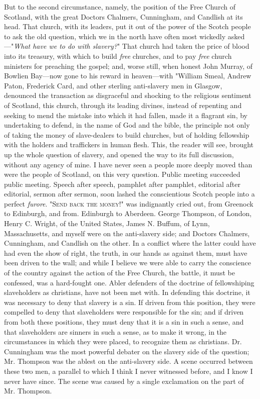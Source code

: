 But to the second circumstance, namely, the position of the Free Church
of Scotland, with the great Doctors Chalmers, Cunningham, and Candlish
at its head. That church, with its leaders, put it out of the power of
the Scotch people to ask the old question, which we in the north have
often most wickedly asked---"\emph{What have we to do with slavery?}"
That church had taken the price of blood into its treasury, with which
to build \emph{free} churches, and to pay \emph{free} church ministers
for preaching the gospel; and, worse still, when honest John Murray, of
Bowlien Bay---now gone to his reward in heaven---with "William Smeal,
Andrew Paton, Frederick Card, and other sterling anti-slavery men in
Glasgow, denounced the transaction as disgraceful and shocking to the
religious sentiment of Scotland, this church, through its leading
divines, instead of repenting and seeking to mend the mistake into which
it had fallen, made {}it a flagrant sin, by undertaking to defend, in
the name of God and the bible, the principle not only of taking the
money of slave-dealers to build churches, but of holding fellowship with
the holders and traffickers in human flesh. This, the reader will see,
brought up the whole question of slavery, and opened the way to its full
discussion, without any agency of mine. I have never seen a people more
deeply moved than were the people of Scotland, on this very question.
Public meeting succeeded public meeting. Speech after speech, pamphlet
after pamphlet, editorial after editorial, sermon after sermon, soon
lashed the conscientious Scotch people into a perfect \emph{furore}.
"\textsc{Send back the money}!" was indignantly cried out, from Greenock
to Edinburgh, and from. Edinburgh to Aberdeen. George Thompson, of
London, Henry C. Wright, of the United States, James N. Buffum, of Lynn,
Massachusetts, and myself were on the anti-slavery side; and Doctors
Chalmers, Cunningham, and Candlish on the other. In a conflict where the
latter could have had even the show of right, the truth, in our hands as
against them, must have been driven to the wall; and while I believe we
were able to carry the conscience of the country against the action of
the Free Church, the battle, it must be confessed, was a hard-fought
one. Abler defenders of the doctrine of fellowshiping slaveholders as
christians, have not been met with. In defending this doctrine, it was
necessary to deny that slavery is a sin. If driven from this position,
they were compelled to deny that slaveholders were responsible for the
sin; and if driven from both these {}positions, they must deny that it
is a sin in such a sense, and that slaveholders are sinners in such a
sense, as to make it wrong, in the circumstances in which they were
placed, to recognize them as christians. Dr. Cunningham was the most
powerful debater on the slavery side of the question; Mr. Thompson was
the ablest on the anti-slavery side. A scene occurred between these two
men, a parallel to which I think I never witnessed before, and I know I
never have since. The scene was caused by a single exclamation on the
part of Mr. Thompson.

